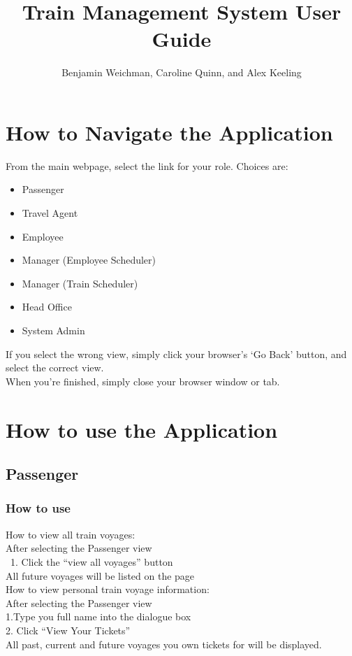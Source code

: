 \documentclass[letter]{article}
\title{Train Management System User Guide}
\author{Benjamin Weichman, Caroline Quinn, and Alex Keeling}
\date{}
\begin{document}
\maketitle

\section{How to Navigate the Application}
From the main webpage, select the link for your role. Choices are: 
\begin{itemize}
\item Passenger
\item Travel Agent
\item Employee
\item Manager (Employee Scheduler)
\item Manager (Train Scheduler)
\item Head Office
\item System Admin
\end{itemize}

If you select the wrong view, simply click your browser's `Go Back' button, and select the correct view. \\

When you're finished, simply close your browser window or tab.


\section{How to use the Application}

\subsection{Passenger}
\subsubsection{How to use}

How to view all train voyages:\\ 
After selecting the Passenger view \\\
1. Click the “view all voyages” button\\
All future voyages will be listed on the page\\ 

How to view personal train voyage information:\\
After selecting the Passenger view  \\
1.Type you full name into the dialogue box\\
2. Click “View Your Tickets” \\
All past, current and future voyages you own tickets for will be displayed. 
\end{document}
